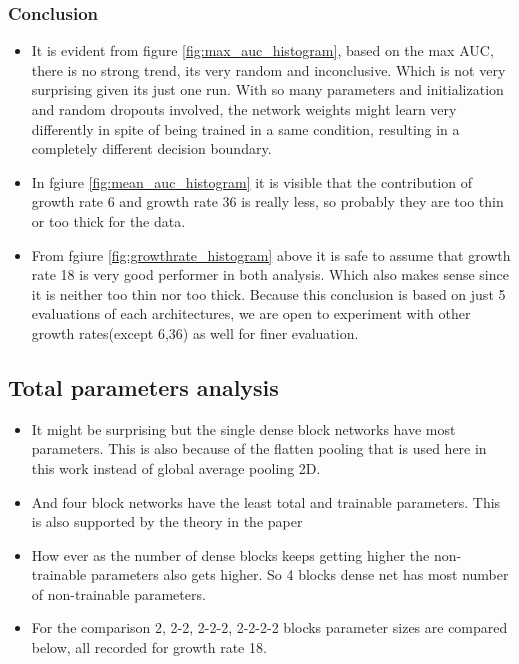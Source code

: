\subsubsection{Conclusion}
\begin{itemize}
 \item It is evident from figure \ref{fig:max_auc_histogram}, based on the max AUC, there is no strong trend, its very random and inconclusive. Which is not very surprising given its just one run. 
With so many parameters and initialization and random dropouts involved, the network weights might learn very differently in spite of being trained in a same condition, resulting in a completely different decision boundary.
 \item In fgiure \ref{fig:mean_auc_histogram} it is visible that the contribution of growth rate 6 and growth rate 36 is really less, so probably they are too thin or too thick for the data. 
 \item From fgiure \ref{fig:growthrate_histogram} above it is safe to assume that growth rate 18 is very good performer in both analysis. Which also makes sense since it is neither too thin nor too thick. Because this conclusion 
 is based on just 5 evaluations of each architectures, we are open to experiment with other growth rates(except 6,36) as well for finer evaluation.
\end{itemize}

\subsection{Total parameters analysis}
\begin{itemize}
 \item It might be surprising but the single dense block networks have most parameters. This is also because of the flatten pooling that is used here in this work instead of global average pooling 2D. 
 \item And four block networks have the least total and trainable parameters. This is also supported by the theory in the paper
 \item How ever as the number of dense blocks keeps getting higher the non-trainable parameters also gets higher. So 4 blocks dense net has most number of non-trainable parameters.
 \item For the comparison 2, 2-2, 2-2-2, 2-2-2-2 blocks parameter sizes are compared below, all recorded for growth rate 18.
\end{itemize}


